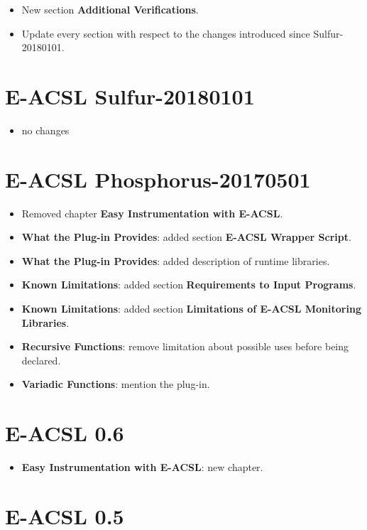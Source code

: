 \begin{itemize}
\item New section \textbf{Additional Verifications}.
\item Update every section with respect to the changes introduced since \eacsl
  Sulfur-20180101.
\end{itemize}

\section*{E-ACSL Sulfur-20180101}

\begin{itemize}
\item no changes
\end{itemize}

\section*{E-ACSL Phosphorus-20170501}

\begin{itemize}
\item Removed chapter \textbf{Easy Instrumentation with E-ACSL}.
\item \textbf{What the Plug-in Provides}: added section \textbf{E-ACSL Wrapper
  Script}.
\item \textbf{What the Plug-in Provides}: added description of \eacsl runtime
  libraries.
\item \textbf{Known Limitations}: added section \textbf{Requirements to Input
  Programs}.
\item \textbf{Known Limitations}: added section \textbf{Limitations of E-ACSL Monitoring Libraries}.
\item \textbf{Recursive Functions}: remove limitation about possible uses before
  being declared.
\item \textbf{Variadic Functions}: mention the \variadic plug-in.
\end{itemize}

\section*{E-ACSL 0.6}

\begin{itemize}
\item \textbf{Easy Instrumentation with E-ACSL}: new chapter.
\end{itemize}

\section*{E-ACSL 0.5}


